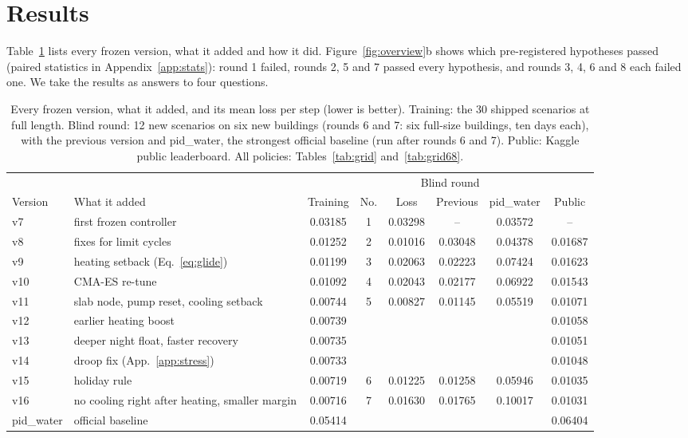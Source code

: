 \documentclass{article}
\begin{document}
\section{Results}\label{sec:results}
Table~\ref{tab:main} lists every frozen version, what it added and how it did. Figure~\ref{fig:overview}b shows which pre-registered hypotheses passed (paired
statistics in Appendix~\ref{app:stats}): round 1 failed, rounds 2, 5 and 7 passed every hypothesis, and rounds 3, 4, 6
and 8 each failed one. We take the results as answers to four questions.
\begin{table}[!htb]\centering
\caption{Every frozen version, what it added, and its mean loss per step (lower is better). Training: the 30 shipped
scenarios at full length. Blind round: 12 new scenarios on six new buildings (rounds 6 and 7: six full-size
buildings, ten days each), with the previous version and pid\_water, the strongest official baseline (run after rounds
6 and 7). Public: Kaggle public leaderboard. All policies: Tables~\ref{tab:grid} and~\ref{tab:grid68}.}\label{tab:main}
\small
\setlength{\tabcolsep}{3.5pt}
\begin{tabular}{l>{\raggedright\arraybackslash}p{3.4cm}cccccc}\toprule
 & & & \multicolumn{4}{c}{Blind round} & \\\cmidrule(lr){4-7}
Version & What it added & Training & No. & Loss & Previous & pid\_water & Public\\\midrule
v7 & first frozen controller & 0.03185 & 1 & 0.03298 & -- & 0.03572 & --\\
v8 & fixes for limit cycles & 0.01252 & 2 & 0.01016 & 0.03048 & 0.04378 & 0.01687\\
v9 & heating setback (Eq.~\ref{eq:glide}) & 0.01199 & 3 & 0.02063 & 0.02223 & 0.07424 & 0.01623\\
v10 & CMA-ES re-tune & 0.01092 & 4 & 0.02043 & 0.02177 & 0.06922 & 0.01543\\
v11 & slab node, pump reset, cooling setback & 0.00744 & 5 & 0.00827 & 0.01145 & 0.05519 & 0.01071\\
v12 & earlier heating boost & 0.00739 & & & & & 0.01058\\
v13 & deeper night float, faster recovery & 0.00735 & & & & & 0.01051\\
v14 & droop fix (App.~\ref{app:stress}) & 0.00733 & & & & & 0.01048\\
v15 & holiday rule & 0.00719 & 6 & 0.01225 & 0.01258 & 0.05946 & 0.01035\\
v16 & no cooling right after heating, smaller margin & 0.00716 & 7 & 0.01630 & 0.01765 & 0.10017 & 0.01031\\\midrule
pid\_water & official baseline & 0.05414 & & & & & 0.06404\\\bottomrule
\end{tabular}
\end{table}
\end{document}
